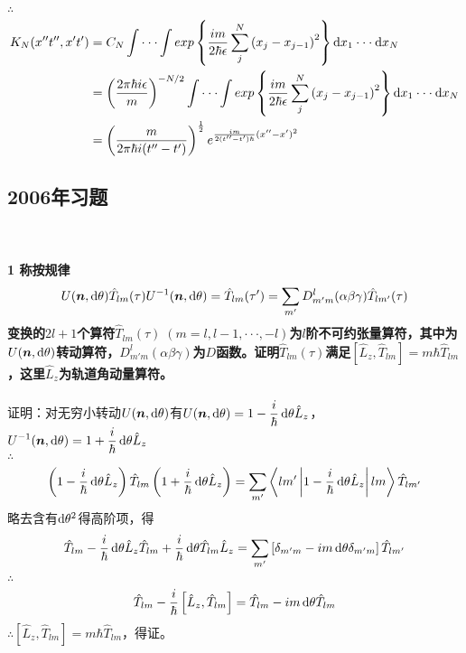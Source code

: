 \documentclass[12pt]{article}
\numberwithin{equation}{section}	 %
\begin{document}
\begin{spacing}{1.5}
$\therefore$
\begin{align*}
K_{N}(x''t'',x't') &= C_{N}\int \cdot\cdot\cdot \int exp\left\{\frac{im}{2\hbar\epsilon}\sum_{j}^{N}\left(x_{j}-x_{j-1}\right)^{2}\right\} \mathop{}\!\mathrm{d} x_{1} \cdot\cdot\cdot \mathop{}\!\mathrm{d} x_{N} \\
&= \left(\frac{2\pi\hbar i\epsilon}{m}\right)^{-N/2}\int \cdot\cdot\cdot \int exp\left\{\frac{im}{2\hbar\epsilon}\sum_{j}^{N}\left(x_{j}-x_{j-1}\right)^{2}\right\} \mathop{}\!\mathrm{d} x_{1} \cdot\cdot\cdot \mathop{}\!\mathrm{d} x_{N} \\
&= \left(\frac{m}{2\pi\hbar i(t''-t')}\right)^{\frac{1}{2}} e^{\frac{im}{2(t''-t')\hbar}(x''-x')^{2}}
\end{align*}


\newpage
\subsection{2006年习题}
~\\
~\\
\textbf{1 \quad 称按规律
\begin{equation}\nonumber 		%
U(\bm{n},\dif\theta) \hat{T}_{lm}(\tau) U^{-1}(\bm{n},\dif\theta) = \hat{T}_{lm}(\tau') = \sum_{m'}D^{l}_{m'm}(\alpha\beta\gamma)\hat{T}_{lm'}(\tau)
\end{equation}
变换的$2l+1$个算符$\hat{T}_{lm}(\tau) \; (m=l,l-1,\cdot\cdot\cdot,-l)$为$l$阶不可约张量算符，其中为$U(\bm{n},\mathop{}\!\mathrm{d}\theta)$转动算符，$D^{l}_{m'm}(\alpha\beta\gamma)$为$D$函数。证明$\hat{T}_{lm}(\tau)$满足$\displaystyle \left[ \hat{L}_{z},\hat{T}_{lm} \right]=m\hbar\hat{T}_{lm}$，这里$\hat{L}_{z}$为轨道角动量算符。
}\\
~\\
证明：对无穷小转动$U(\bm{n},\mathop{}\!\mathrm{d}\theta)$有$\displaystyle U(\bm{n},\mathop{}\!\mathrm{d}\theta) = 1-\frac{i}{\hbar}\mathop{}\!\mathrm{d}\theta\hat{L}_{z}$，$\displaystyle U^{-1}(\bm{n},\mathop{}\!\mathrm{d}\theta) = 1+\frac{i}{\hbar}\mathop{}\!\mathrm{d}\theta\hat{L}_{z}$\\
$\therefore$
\begin{equation}
\left(1-\frac{i}{\hbar}\mathop{}\!\mathrm{d}\theta\hat{L}_{z}\right) \hat{T}_{lm} \left(1+\frac{i}{\hbar}\mathop{}\!\mathrm{d}\theta\hat{L}_{z}\right) = \sum_{m'}\left<lm'\left|1-\frac{i}{\hbar}\mathop{}\!\mathrm{d}\theta\hat{L}_{z}\right|lm\right>\hat{T}_{lm'}
\end{equation}
略去含有$\mathop{}\!\mathrm{d}\theta^{2}$得高阶项，得
\begin{equation}
\hat{T}_{lm} -\frac{i}{\hbar}\mathop{}\!\mathrm{d}\theta\hat{L}_{z}\hat{T}_{lm} +\frac{i}{\hbar}\mathop{}\!\mathrm{d}\theta\hat{T}_{lm}\hat{L}_{z}  = \sum_{m'}\left[ \delta_{m'm} -im\mathop{}\!\mathrm{d}\theta \delta_{m'm} \right]\hat{T}_{lm'}
\end{equation}
$\therefore$
\begin{equation}
\hat{T}_{lm} - \frac{i}{\hbar}\left[ \hat{L}_{z},\hat{T}_{lm} \right] = \hat{T}_{lm} - im\mathop{}\!\mathrm{d}\theta\hat{T}_{lm} 
\end{equation}
$\therefore \displaystyle \left[ \hat{L}_{z},\hat{T}_{lm} \right]=m\hbar\hat{T}_{lm}$，得证。\\
~\\
~\\



\end{spacing}
\end{document}

